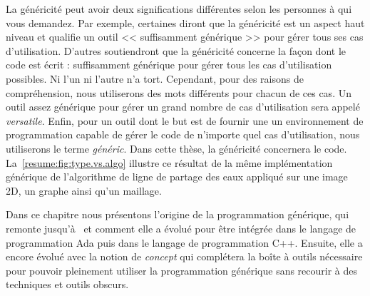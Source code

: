 La généricité peut avoir deux significations différentes selon les personnes à qui vous demandez. Par exemple, certaines
diront que la généricité est un aspect haut niveau et qualifie un outil << suffisamment générique >> pour gérer tous ses
cas d'utilisation. D'autres soutiendront que la généricité concerne la façon dont le code est écrit : suffisamment
générique pour gérer tous les cas d'utilisation possibles. Ni l'un ni l'autre n'a tort. Cependant, pour des raisons de
compréhension, nous utiliserons des mots différents pour chacun de ces cas. Un outil assez générique pour gérer un grand
nombre de cas d'utilisation sera appelé \emph{versatile}. Enfin, pour un outil dont le but est de fournir une un
environnement de programmation capable de gérer le code de n'importe quel cas d'utilisation, nous utiliserons le terme
\emph{généric}. Dans cette thèse, la généricité concernera le code. La~\cref{resume:fig:type.vs.algo} illustre ce
résultat de la même implémentation générique de l'algorithme de ligne de partage des eaux appliqué sur une image 2D, un
graphe ainsi qu'un maillage.

Dans ce chapitre nous présentons l'origine de la programmation générique, qui remonte
jusqu'à~ et comment elle a évolué pour être intégrée dans le langage de
programmation Ada puis dans le langage de programmation C++. Ensuite, elle a encore évolué avec la notion de
\emph{concept} qui complétera la boîte à outils nécessaire pour pouvoir pleinement utiliser la programmation générique
sans recourir à des techniques et outils obscurs.

